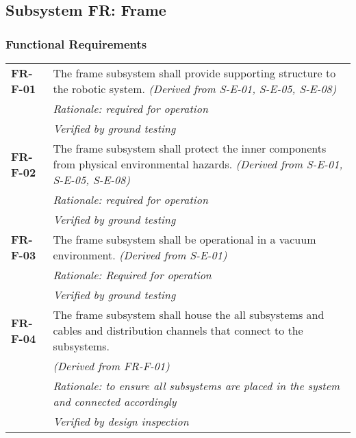 \subsection{Subsystem FR: Frame}
\label{sect:FR_req}
\subsubsection*{Functional Requirements}
\vspace{-15pt}
\begin{longtable}{P{2cm}P{13.25cm}}
\textbf{FR-F-01}	&
The frame subsystem shall provide supporting structure to the robotic system.
\textit{(Derived from S-E-01, S-E-05, S-E-08)}	\\
& \textit{Rationale: required for operation}	\\
& \textit{Verified by ground testing}	\\

\textbf{FR-F-02}	&
The frame subsystem shall protect the inner components from physical environmental hazards.
\textit{(Derived from S-E-01, S-E-05, S-E-08)}	\\
& \textit{Rationale: required for operation}	\\
& \textit{Verified by ground testing}	\\

\textbf{FR-F-03}	&
The frame subsystem shall be operational in a vacuum environment.
\textit{(Derived from S-E-01)}\\
& \textit{Rationale: Required for operation}	\\
& \textit{Verified by ground testing}	\\

\textbf{FR-F-04}	& The frame subsystem shall house the all subsystems and cables and distribution channels that connect to the subsystems. \\
& \textit{(Derived from FR-F-01)}	\\
& \textit{Rationale: to ensure all subsystems are placed in the system and connected accordingly} \\
& \textit{Verified by design inspection}
\end{longtable}
\vspace{-15pt}
